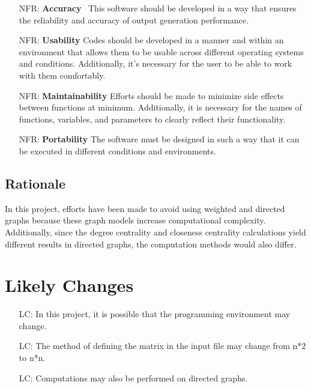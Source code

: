 \documentclass[12pt]{article}
\newcounter{nfrnum} %
\newcounter{lcnum} %
\begin{document}
\noindent \begin{itemize}

\item[NFR\refstepcounter{nfrnum}\thenfrnum \label{NFR_Accuracy}:]
  \textbf{Accuracy} \
This software should be developed in a way that ensures the reliability and accuracy of output generation performance.
\item[NFR\refstepcounter{nfrnum}\thenfrnum \label{NFR_Usability}:] \textbf{Usability}
Codes should be developed in a manner and within an environment that allows them to be usable across different operating systems and conditions. Additionally, it's necessary for the user to be able to work with them comfortably.
\item[NFR\refstepcounter{nfrnum}\thenfrnum \label{NFR_Maintainability}:]
  \textbf{Maintainability} 
Efforts should be made to minimize side effects between functions at minimum. Additionally, it is necessary for the names of functions, variables, and parameters to clearly reflect their functionality.

\item[NFR\refstepcounter{nfrnum}\thenfrnum \label{NFR_Portability}:]
  \textbf{Portability}
The software must be designed in such a way that it can be executed in different conditions and environments.


\end{itemize}

\subsection{Rationale}


In this project, efforts have been made to avoid using weighted and directed graphs because these graph models increase computational complexity. Additionally, since the degree centrality and closeness centrality calculations yield different results in directed graphs, the computation methods would also differ.

\section{Likely Changes}    

\noindent \begin{itemize}

\item[LC\refstepcounter{lcnum}\thelcnum\label{LC_meaningfulLabel}:] In this project, it is possible that the programming environment may change.

\item[LC\refstepcounter{lcnum}\thelcnum\label{LC_meaningfulLabel}:]  The method of defining the matrix in the input file may change from n*2 to n*n.
\item[LC\refstepcounter{lcnum}\thelcnum\label{LC_meaningfulLabel}:]  Computations may also be performed on directed graphs.

\end{itemize}
\end{document}
